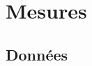 \documentclass[a4paper,9pt,french]{scrartcl}
\begin{document}
\section{Mesures}
\subsection{Données}
\end{document}
